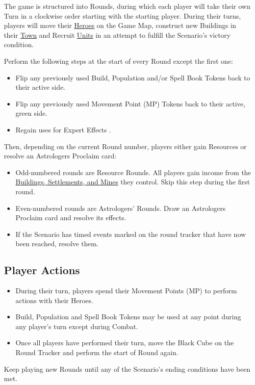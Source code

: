 The game is structured into Rounds, during which each player will take their own Turn in a clockwise order starting with the starting player.
During their turns, players will move their \hyperlink{Heroes}{Heroes} on the Game Map, construct new Buildings in their \hyperlink{Town}{Town} and Recruit \hyperlink{Units}{Units} in an attempt to fulfill the Scenario’s victory condition.\par
Perform the following steps at the start of every Round except the first one:
\begin{itemize}
  \item Flip any previously used Build, Population and/or Spell Book Tokens back to their active side.
  \item Flip any previously used Movement Point (MP) Tokens back to their active, green side.
  \item Regain uses for Expert Effects .
\end{itemize}
Then, depending on the current Round number, players either gain Resources or resolve an Astrologers Proclaim card:
\begin{itemize}
  \item Odd-numbered rounds are Resource Rounds.
    All players gain income from the \hyperlink{Mines}{Buildings, Settlements, and Mines} they control.
    Skip this step during the first round.
  \item Even-numbered rounds are Astrologers’ Rounds.
    Draw an Astrologers Proclaim card and resolve its effects.
  \item If the Scenario has timed events marked on the round tracker that have now been reached, resolve them.
\end{itemize}
\subsection*{Player Actions}
\begin{itemize}
  \item During their turn, players spend their Movement Points (MP) to perform actions with their Heroes.
  \item Build, Population and Spell Book Tokens may be used at any point during any player’s turn except during Combat.
  \item Once all players have performed their turn, move the Black Cube on the Round Tracker and perform the start of Round again.
\end{itemize}
Keep playing new Rounds until any of the Scenario’s ending conditions have been met.
